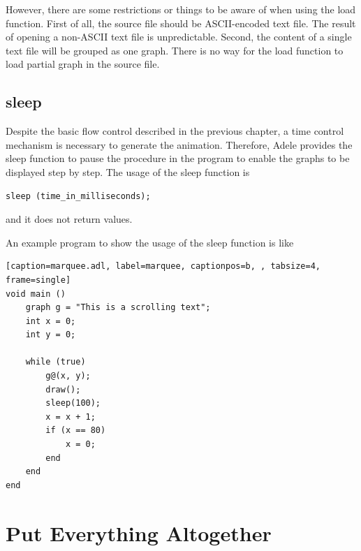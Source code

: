 \documentclass[11pt,letterpaper]{article}
\begin{document}
However, there are some restrictions or things to be aware of when using the load function. First of all, the source file should be ASCII-encoded text file. The result of opening a non-ASCII text file is unpredictable. Second, the content of a single text file will be grouped as one graph. There is no way for the load function to load partial graph in the source file.

\subsection {sleep}

Despite the basic flow control described in the previous chapter, a time control mechanism is necessary to generate the animation. Therefore, Adele provides the sleep function to pause the procedure in the program to enable the graphs to be displayed step by step. The usage of the sleep function is
\begin{lstlisting}[tabsize=4]
	sleep (time_in_milliseconds);
\end{lstlisting}
and it does not return values.

An example program to show the usage of the sleep function is like

\begin{lstlisting}[caption=marquee.adl, label=marquee, captionpos=b, , tabsize=4, frame=single]
void main ()
	graph g = "This is a scrolling text";
	int x = 0;
	int y = 0;
		
	while (true)
		g@(x, y);
		draw();
		sleep(100);
		x = x + 1;
		if (x == 80)
			x = 0;
		end
	end
end
\end{lstlisting}

\section {Put Everything Altogether}
\end{document}
